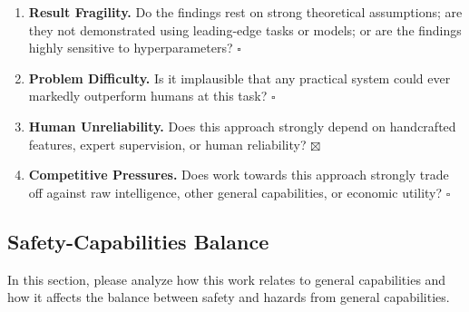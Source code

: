 \begin{enumerate}[leftmargin=*]
    \item \textbf{Result Fragility.} Do the findings rest on strong theoretical assumptions; are they not demonstrated using leading-edge tasks or models; or are the findings highly sensitive to hyperparameters? \hfill $\square$

    \item \textbf{Problem Difficulty.} Is it implausible that any practical system could ever markedly outperform humans at this task? \hfill $\square$

    \item \textbf{Human Unreliability.} Does this approach strongly depend on handcrafted features, expert supervision, or human reliability? \hfill $\boxtimes$

    \item \textbf{Competitive Pressures.} Does work towards this approach strongly trade off against raw intelligence, other general capabilities, or economic utility? \hfill $\square$

\end{enumerate}


\subsection{Safety-Capabilities Balance}
In this section, please analyze how this work relates to general capabilities and how it affects the balance between safety and hazards from general capabilities.

